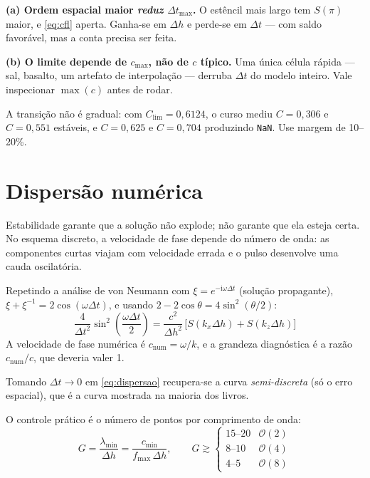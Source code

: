 \documentclass[11pt,a4paper,oneside]{report}
\begin{document}
\begin{atencao}
\textbf{(a) Ordem espacial maior \emph{reduz} $\Delta t_{\max}$.} O est\^encil
mais largo tem $S(\pi)$ maior, e \eqref{eq:cfl} aperta. Ganha-se em $\Delta h$
e perde-se em $\Delta t$ --- com saldo favor\'avel, mas a conta precisa ser
feita.

\textbf{(b) O limite depende de $c_{\max}$, n\~ao de $c$ t\'ipico.} Uma
\'unica c\'elula r\'apida --- sal, basalto, um artefato de interpola\c{c}\~ao
--- derruba $\Delta t$ do modelo inteiro. Vale inspecionar
$\max(c)$ antes de rodar.
\end{atencao}

A transi\c{c}\~ao n\~ao \'e gradual: com $C_{\lim} = 0{,}6124$, o curso mediu
$C = 0{,}306$ e $C = 0{,}551$ est\'aveis, e $C = 0{,}625$ e $C = 0{,}704$
produzindo \texttt{NaN}. Use margem de 10--20\%.

\section{Dispers\~ao num\'erica}

Estabilidade garante que a solu\c{c}\~ao n\~ao explode; n\~ao garante que ela
esteja certa. No esquema discreto, a velocidade de fase depende do n\'umero de
onda: as componentes curtas viajam com velocidade errada e o pulso desenvolve
uma cauda oscilat\'oria.

\begin{derivacao}
Repetindo a an\'alise de von Neumann com $\xi = e^{-\mathrm{i}\omega\Delta t}$
(solu\c{c}\~ao propagante), $\xi + \xi^{-1} = 2\cos(\omega\Delta t)$, e usando
$2 - 2\cos\theta = 4\sin^{2}(\theta/2)$:
\begin{equation}
\boxed{\;
\frac{4}{\Delta t^{2}}\sin^{2}\!\left(\frac{\omega\Delta t}{2}\right)
 = \frac{c^{2}}{\Delta h^{2}}\,
   \bigl[S(k_x\Delta h) + S(k_z\Delta h)\bigr] \;}
\label{eq:dispersao}
\end{equation}
A velocidade de fase num\'erica \'e $c_{\text{num}} = \omega/k$, e a grandeza
diagn\'ostica \'e a raz\~ao $c_{\text{num}}/c$, que deveria valer 1.

Tomando $\Delta t \to 0$ em \eqref{eq:dispersao} recupera-se a curva
\emph{semi-discreta} (s\'o o erro espacial), que \'e a curva mostrada na
maioria dos livros.
\end{derivacao}

O controle pr\'atico \'e o n\'umero de pontos por comprimento de onda:
\begin{equation}
G = \frac{\lambda_{\min}}{\Delta h} = \frac{c_{\min}}{f_{\max}\,\Delta h},
\qquad
G \gtrsim
\begin{cases}
15\text{--}20 & \mathcal{O}(2)\\
8\text{--}10  & \mathcal{O}(4)\\
4\text{--}5   & \mathcal{O}(8)
\end{cases}
\label{eq:G}
\end{equation}
\end{document}
